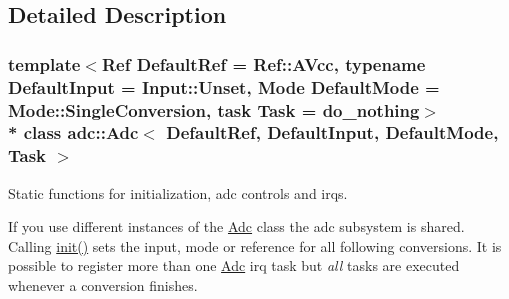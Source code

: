 \subsection{Detailed Description}
\subsubsection*{template$<$Ref Default\+Ref = Ref\+::\+A\+Vcc, typename Default\+Input = Input\+::\+Unset, Mode Default\+Mode = Mode\+::\+Single\+Conversion, task Task = do\+\_\+nothing$>$\\*
class adc\+::\+Adc$<$ Default\+Ref, Default\+Input, Default\+Mode, Task $>$}

Static functions for initialization, adc controls and irqs. 

If you use different instances of the \hyperlink{classadc_1_1Adc}{Adc} class the adc subsystem is shared. Calling \hyperlink{classadc_1_1Adc_ae453bb940554c62082776bd41a9053a3}{init()} sets the input, mode or reference for all following conversions. It is possible to register more than one \hyperlink{classadc_1_1Adc}{Adc} irq task but {\itshape all} tasks are executed whenever a conversion finishes.


